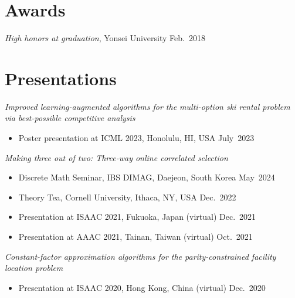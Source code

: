 \documentclass{article}
\newcommand{\killinitspace}{-0.7em}
\begin{document}

\section{Awards}
\textsl{High honors at graduation}, Yonsei University \hfill Feb.~2018

\section{Presentations}
\textsl{Improved learning-augmented algorithms for the multi-option ski rental problem via best-possible competitive analysis}
\vspace{\killinitspace}
\begin{itemize}
\item Poster presentation at ICML 2023, Honolulu, HI, USA \hfill July~2023
\end{itemize}

\textsl{Making three out of two: Three-way online correlated selection}
\vspace{\killinitspace}
\begin{itemize}
\item Discrete Math Seminar, IBS DIMAG, Daejeon, South Korea \hfill May~2024
\item Theory Tea, Cornell University, Ithaca, NY, USA \hfill Dec.~2022
\item Presentation at ISAAC 2021, Fukuoka, Japan (virtual) \hfill Dec.~2021
\item Presentation at AAAC 2021, Tainan, Taiwan (virtual) \hfill Oct.~2021
\end{itemize}

\textsl{Constant-factor approximation algorithms for the parity-constrained facility location problem}
\vspace{\killinitspace}
\begin{itemize}
\item Presentation at ISAAC 2020, Hong Kong, China (virtual) \hfill Dec.~2020
\end{itemize}
\end{document}
